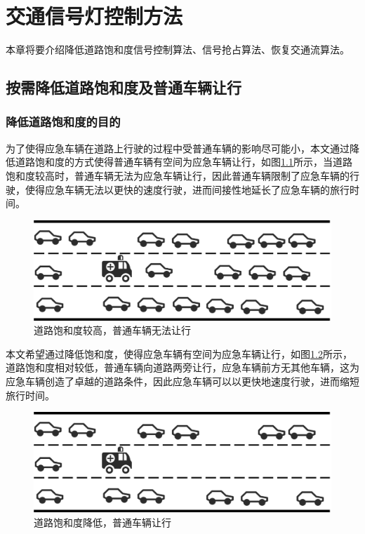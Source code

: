 
\chapter{交通信号灯控制方法}
\label{ch4}
本章将要介绍降低道路饱和度信号控制算法、信号抢占算法、恢复交通流算法。




\section{按需降低道路饱和度及普通车辆让行}
\subsection{降低道路饱和度的目的}
为了使得应急车辆在道路上行驶的过程中受普通车辆的影响尽可能小，本文通过降低道路饱和度的方式使得普通车辆有空间为应急车辆让行，如图\ref{fig:highsituration}所示，当道路饱和度较高时，普通车辆无法为应急车辆让行，因此普通车辆限制了应急车辆的行驶，使得应急车辆无法以更快的速度行驶，进而间接性地延长了应急车辆的旅行时间。
\begin{figure}[ht]
	\centering
	\includegraphics[width=\textwidth]{figures/highsituration.png}
	\caption{道路饱和度较高，普通车辆无法让行}
	\label{fig:highsituration}
\end{figure}

本文希望通过降低饱和度，使得应急车辆有空间为应急车辆让行，如图\ref{fig:lowsituration}所示，道路饱和度相对较低，普通车辆向道路两旁让行，应急车辆前方无其他车辆，这为应急车辆创造了卓越的道路条件，因此应急车辆可以以更快地速度行驶，进而缩短旅行时间。

\begin{figure}[ht]
	\centering
	\includegraphics[width=\textwidth]{figures/lowsituration.png}
	\caption{道路饱和度降低，普通车辆让行}
	\label{fig:lowsituration}
\end{figure}

